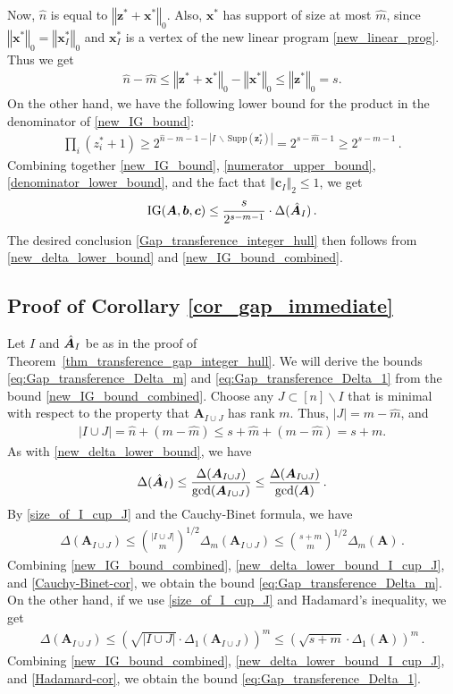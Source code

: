 \documentclass[runningheads]{llncs}
\newcommand{\ve}{\boldsymbol}
\newcommand{\be}{\begin{eqnarray}}
\newcommand{\ee}{\end{eqnarray}}
\renewcommand\>{\rangle}
\newcommand\<{\langle}
\newcommand\0{\mathbf{0}}
\newcommand\bb{\ve b}%
\newcommand\cc{\ve c}%
\newcommand\xx{\ve x}%
\newcommand\zz{\ve z}%
\renewcommand\AA{\ve A}%
\newcommand\IG{\mathrm{IG}}%
\newcommand{\norm}[1]{\left\Vert #1\right\Vert }%
\newcommand\AAhat{\hat{\AA\;}\negthickspace}%
\begin{document}
Now, $\hat{n}$ is equal to $\norm{\zz^*+\xx^*}_0$. Also, $\xx^*$ has support of size at most $\hat{m}$, since $\norm{\xx^*}_0=\norm{\xx_I^*}_0$ and $\xx_I^*$ is a vertex of the new linear program \eqref{new_linear_prog}. Thus we get
\be
\label{numerator_upper_bound}
\hat{n}-\hat{m}\leq\norm{\zz^*+\xx^*}_0-\norm{\xx^*}_0\leq\norm{\zz^*}_0=s.
\ee
On the other hand, we have the following lower bound for the product in the denominator of \eqref{new_IG_bound}:
\be
\label{denominator_lower_bound}
\prod_i (z_i^*+1)\geq 2^{\hat{n}-\hat{m}-1-\left|I\,\backslash\,\text{Supp}(\zz_I^*)\right|}
=2^{s-\hat{m}-1}
\geq 2^{s-m-1}\,.
\ee
Combining together \eqref{new_IG_bound}, \eqref{numerator_upper_bound}, \eqref{denominator_lower_bound}, and the fact that $\norm{\cc_I}_2\leq1$, we get
\be\label{new_IG_bound_combined}
\IG(\AA,\bb,\cc)\leq\frac{s}{2^{s-m-1}}\cdot\Delta(\AAhat_I)\,.
\ee
The desired conclusion \eqref{Gap_transference_integer_hull} then follows from \eqref{new_delta_lower_bound} and \eqref{new_IG_bound_combined}. 

\subsection{Proof of Corollary \ref{cor_gap_immediate}}


Let $I$ and $\AAhat_I$ be as in the proof of Theorem~\ref{thm_transference_gap_integer_hull}. We will derive the bounds \eqref{eq:Gap_transference_Delta_m} and \eqref{eq:Gap_transference_Delta_1}
from the bound \eqref{new_IG_bound_combined}. Choose any $J\subset [n]\backslash I$ that is minimal with respect to the property that $\AA_{I\cup J}$ has rank $m$. Thus, $\left|J\right|=m-\hat{m}$, and \be
\label{size_of_I_cup_J}
\left|I\cup J\right| = \hat{n}+(m-\hat{m}) \leq s+\hat{m} +(m-\hat{m}) = s+m.
\ee
As with \eqref{new_delta_lower_bound}, we have
\be\label{new_delta_lower_bound_I_cup_J}
\Delta({\AAhat}_I)\leq\frac{\Delta(\AA_{I\cup J})}{\gcd(\AA_{I\cup J})}\leq\frac{\Delta(\AA_{I\cup J})}{\gcd(\AA)}\,.
\ee
%
By \eqref{size_of_I_cup_J} and the Cauchy-Binet formula, we have
%
\be\label{Cauchy-Binet-cor}
\Delta(\AA_{I\cup J})\le {\left|I\cup J\right|\choose m}^{1/2}\Delta_m(\AA_{I\cup J})\le {s+m\choose m}^{1/2}\Delta_m(\AA)\,. %
\ee
%
Combining \eqref{new_IG_bound_combined}, \eqref{new_delta_lower_bound_I_cup_J}, and \eqref{Cauchy-Binet-cor}, we obtain the bound \eqref{eq:Gap_transference_Delta_m}. On the other hand, if we use \eqref{size_of_I_cup_J} and Hadamard's inequality, we get
%
\be\label{Hadamard-cor}
\Delta(\AA_{I\cup J})\le (\sqrt{\left|I\cup J\right|}\cdot\Delta_1(\AA_{I\cup J}))^m\le (\sqrt{s+m}\cdot\Delta_1(\AA))^m\,.
\ee
%
Combining \eqref{new_IG_bound_combined}, \eqref{new_delta_lower_bound_I_cup_J}, and \eqref{Hadamard-cor}, we obtain the bound \eqref{eq:Gap_transference_Delta_1}.
\end{document}
